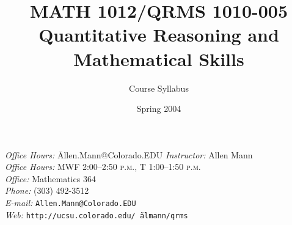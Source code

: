 \documentclass[11pt]{article}
\title{MATH 1012/QRMS 1010-005 \\ Quantitative Reasoning and Mathematical Skills}
\author{Course Syllabus}
\date{Spring 2004}
\newcommand{\PM}{\textsc{p.m.}}
\newcommand{\url}[1]{\texttt{#1}}
\begin{document}
\maketitle



\begin{tabbing}
\textit{Office Hours:} \quad   \= Allen.Mann@Colorado.EDU   \kill
\textit{Instructor:}		\> Allen Mann \\
\textit{Office Hours:}    	\> MWF 2:00--2:50 \PM,  T 1:00--1:50 \PM \\
\textit{Office:}			\> Mathematics 364 \\
\textit{Phone:}			\> (303) 492-3512 \\
\textit{E-mail:}			\> \url{Allen.Mann@Colorado.EDU} \\
\textit{Web:}			\> \url{http://ucsu.colorado.edu/\~\,$\!$almann/qrms}
\end{tabbing}
\end{document}
